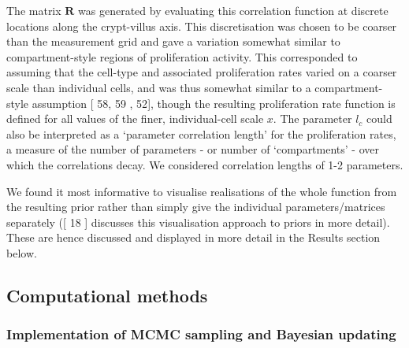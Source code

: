 \documentclass[10pt,letterpaper]{article}
\providecommand{\DIFaddtex}[1]{{\protect\color{blue} \sf #1}} %
\providecommand{\DIFdeltex}[1]{{\protect\color{red} \scriptsize #1}} %
\providecommand{\DIFaddbegin}{} %
\providecommand{\DIFaddend}{} %
\providecommand{\DIFdelbegin}{} %
\providecommand{\DIFdelend}{} %
\providecommand{\DIFadd}[1]{\texorpdfstring{\DIFaddtex{#1}}{#1}} %
\providecommand{\DIFdel}[1]{\texorpdfstring{\DIFdeltex{#1}}{}} %
\begin{document}
The matrix \(\mathbf{R}\) was generated by evaluating this correlation
function at discrete locations along the crypt-villus axis. This
discretisation was chosen to be coarser than the measurement grid and
gave a variation somewhat similar to compartment-style regions of
proliferation activity. This corresponded to assuming that the cell-type
and associated proliferation rates varied on a coarser scale than
individual cells, and was thus somewhat similar to a compartment-style
assumption {[}\DIFdelbegin \DIFdel{58, 59}\DIFdelend \DIFaddbegin \DIFadd{51, 52}\DIFaddend {]}, though the resulting proliferation rate
function is defined for all values of the finer, individual-cell scale
\(x\). The parameter \(l_c\) could also be interpreted as a `parameter
correlation length' for the proliferation rates, a measure of the number
of parameters - or number of `compartments' - over which the
correlations decay. We considered correlation lengths of 1-2 parameters.

We found it most informative to visualise realisations of the whole
function from the resulting prior rather than simply give the individual
parameters/matrices separately ({[}\DIFdelbegin \DIFdel{18}\DIFdelend \DIFaddbegin \DIFadd{21}\DIFaddend {]} discusses this visualisation
approach to priors in more detail). These are hence discussed and
displayed in more detail in the Results section below.

\subsection{Computational methods}\label{computational-methods}

\subsubsection{Implementation of MCMC sampling and Bayesian
updating}\label{implementation-of-mcmc-sampling-and-bayesian-updating}
\end{document}

